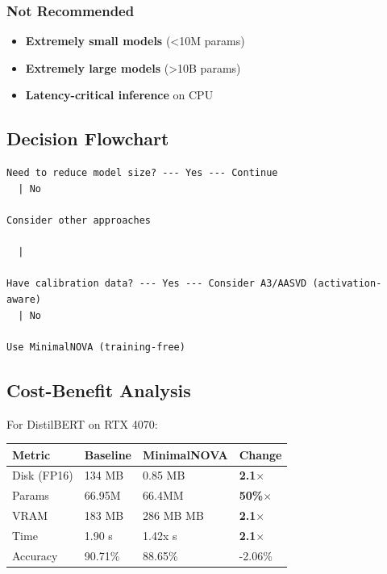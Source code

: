 \subsubsection{Not Recommended}

\begin{itemize}
\item \textbf{Extremely small models} (<10M params)
\item \textbf{Extremely large models} (>10B params)
\item \textbf{Latency-critical inference} on CPU

\end{itemize}
\subsection{Decision Flowchart}

\begin{lstlisting}
Need to reduce model size? --- Yes --- Continue
  | No
   
Consider other approaches

  |
   
Have calibration data? --- Yes --- Consider A3/AASVD (activation-aware)
  | No
   
Use MinimalNOVA (training-free)
\end{lstlisting}

\subsection{Cost-Benefit Analysis}

For DistilBERT on RTX 4070:

\begin{table}[H]
\centering
\small
\begin{tabular}{llll}
\toprule
\textbf{Metric} & \textbf{Baseline} & \textbf{MinimalNOVA} & \textbf{Change} \\
\midrule
Disk (FP16) & 134 MB & 0.85 MB & \textbf{2.1$\times$} \\
Params & 66.95M & 66.4MM & \textbf{50\%$\times$} \\
VRAM & 183 MB & 286 MB MB & \textbf{2.1$\times$} \\
Time & 1.90 s & 1.42x s & \textbf{2.1$\times$} \\
Accuracy & 90.71\% & 88.65\% & -2.06\% \\
\bottomrule
\end{tabular}
\end{table}

